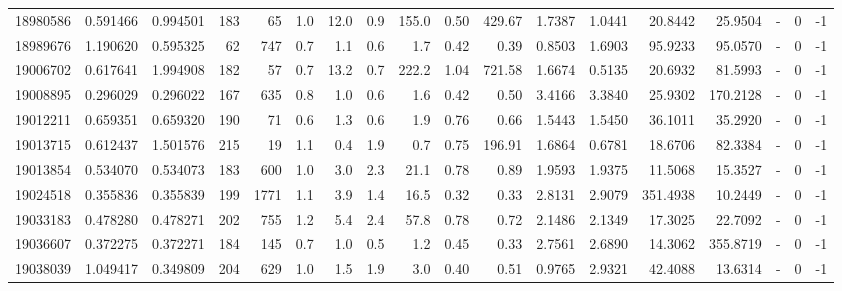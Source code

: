 \begin{tabular}{rrrrrrrrrrrrrrrlrr}
  18980586 & 0.591466 &   0.994501 &  183 &   65 &      1.0 &     12.0 &     0.9 &    155.0 &       0.50 &      429.67 &  1.7387 &  1.0441 &   20.8442 &   25.9504 &             - &        0 &         -1 \\
  18989676 & 1.190620 &   0.595325 &   62 &  747 &      0.7 &      1.1 &     0.6 &      1.7 &       0.42 &        0.39 &  0.8503 &  1.6903 &   95.9233 &   95.0570 &             - &        0 &         -1 \\
  19006702 & 0.617641 &   1.994908 &  182 &   57 &      0.7 &     13.2 &     0.7 &    222.2 &       1.04 &      721.58 &  1.6674 &  0.5135 &   20.6932 &   81.5993 &             - &        0 &         -1 \\
  19008895 & 0.296029 &   0.296022 &  167 &  635 &      0.8 &      1.0 &     0.6 &      1.6 &       0.42 &        0.50 &  3.4166 &  3.3840 &   25.9302 &  170.2128 &             - &        0 &         -1 \\
  19012211 & 0.659351 &   0.659320 &  190 &   71 &      0.6 &      1.3 &     0.6 &      1.9 &       0.76 &        0.66 &  1.5443 &  1.5450 &   36.1011 &   35.2920 &             - &        0 &         -1 \\
  19013715 & 0.612437 &   1.501576 &  215 &   19 &      1.1 &      0.4 &     1.9 &      0.7 &       0.75 &      196.91 &  1.6864 &  0.6781 &   18.6706 &   82.3384 &             - &        0 &         -1 \\
  19013854 & 0.534070 &   0.534073 &  183 &  600 &      1.0 &      3.0 &     2.3 &     21.1 &       0.78 &        0.89 &  1.9593 &  1.9375 &   11.5068 &   15.3527 &             - &        0 &         -1 \\
  19024518 & 0.355836 &   0.355839 &  199 & 1771 &      1.1 &      3.9 &     1.4 &     16.5 &       0.32 &        0.33 &  2.8131 &  2.9079 &  351.4938 &   10.2449 &             - &        0 &         -1 \\
  19033183 & 0.478280 &   0.478271 &  202 &  755 &      1.2 &      5.4 &     2.4 &     57.8 &       0.78 &        0.72 &  2.1486 &  2.1349 &   17.3025 &   22.7092 &             - &        0 &         -1 \\
  19036607 & 0.372275 &   0.372271 &  184 &  145 &      0.7 &      1.0 &     0.5 &      1.2 &       0.45 &        0.33 &  2.7561 &  2.6890 &   14.3062 &  355.8719 &             - &        0 &         -1 \\
  19038039 & 1.049417 &   0.349809 &  204 &  629 &      1.0 &      1.5 &     1.9 &      3.0 &       0.40 &        0.51 &  0.9765 &  2.9321 &   42.4088 &   13.6314 &             - &        0 &         -1 \\

\end{tabular}

